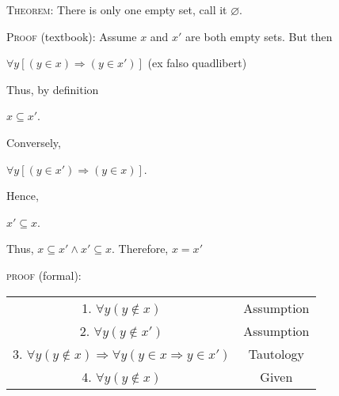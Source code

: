 \documentclass[12pt, a4paper]{article}
\begin{document}
\vspace{6mm}


\textsc{Theorem: }There is only one empty set, call it $\varnothing$.\par

\vspace{4mm}

\textsc{Proof} (textbook): Assume $x$ and $x'$ are both empty sets. But then\par

\vspace{4mm}

\centerline{$\forall y[(y\in x)\Rightarrow (y\in x')]$ (ex falso quadlibert)}

\vspace{4mm}

Thus, by definition\par

\vspace{4mm}

\centerline{$x\subseteq x'$.}\par

\vspace{4mm}

Conversely,\par

\vspace{4mm}

\centerline{$\forall y[(y\in x')\Rightarrow (y\in x)]$.}

\vspace{4mm}

Hence,\par

\vspace{4mm}

\centerline{$x'\subseteq x$.}

\vspace{4mm}

Thus, $x\subseteq x'\wedge x'\subseteq x$. Therefore, $x=x'$\par

\vspace{4mm}

\newpage

\textsc{proof} (formal):\par

\vspace{4mm}


\begin{center}
\begin{tabular}{ c c }
\hline
 1. $\forall y(y\notin x)$\hspace{41mm} &\hspace{10mm} Assumption \\ 
 2. $\forall y(y\notin x')$\hspace{40mm} &\hspace{10mm} Assumption \\  
 3. $\forall y(y\notin x)\Rightarrow\forall y(y\in x\Rightarrow y\in x')$ &\hspace{7mm} Tautology \\
 4. $\forall y(y\notin x)$\hspace{40mm} &\hspace{1mm} Given
\end{tabular}
\end{center}
\end{document}
